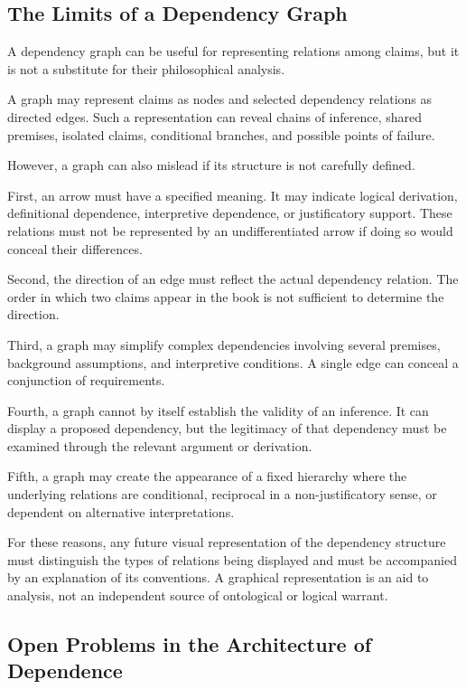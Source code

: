 \subsection{The Limits of a Dependency Graph}

A dependency graph can be useful for representing relations
among claims, but it is not a substitute for their philosophical
analysis.

A graph may represent claims as nodes and selected dependency
relations as directed edges. Such a representation can reveal
chains of inference, shared premises, isolated claims,
conditional branches, and possible points of failure.

However, a graph can also mislead if its structure is not
carefully defined.

First, an arrow must have a specified meaning. It may indicate
logical derivation, definitional dependence, interpretive
dependence, or justificatory support. These relations must
not be represented by an undifferentiated arrow if doing so
would conceal their differences.

Second, the direction of an edge must reflect the actual
dependency relation. The order in which two claims appear
in the book is not sufficient to determine the direction.

Third, a graph may simplify complex dependencies involving
several premises, background assumptions, and interpretive
conditions. A single edge can conceal a conjunction of
requirements.

Fourth, a graph cannot by itself establish the validity of
an inference. It can display a proposed dependency, but the
legitimacy of that dependency must be examined through the
relevant argument or derivation.

Fifth, a graph may create the appearance of a fixed hierarchy
where the underlying relations are conditional, reciprocal
in a non-justificatory sense, or dependent on alternative
interpretations.

For these reasons, any future visual representation of the
dependency structure must distinguish the types of relations
being displayed and must be accompanied by an explanation
of its conventions. A graphical representation is an aid
to analysis, not an independent source of ontological or
logical warrant.

\subsection{Open Problems in the Architecture of Dependence}

